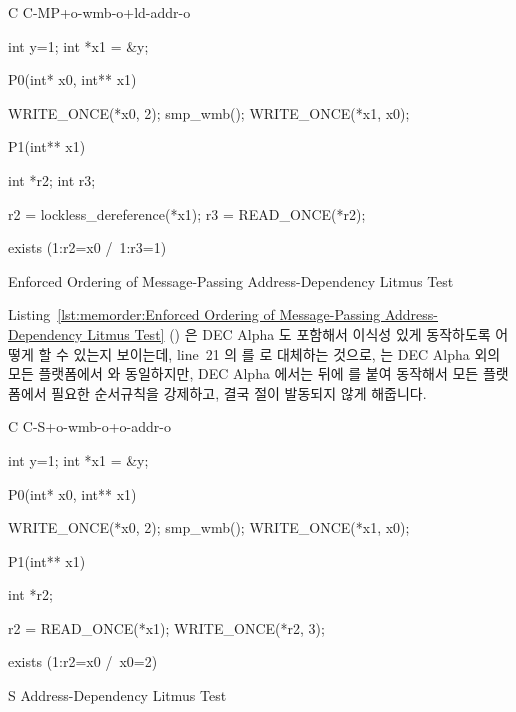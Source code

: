 \begin{listing}[tbp]
{ \scriptsize
\begin{verbbox}[\LstLineNo]
C C-MP+o-wmb-o+ld-addr-o

{
int y=1;
int *x1 = &y;
}

P0(int* x0, int** x1) {

  WRITE_ONCE(*x0, 2);
  smp_wmb();
  WRITE_ONCE(*x1, x0);

}

P1(int** x1) {

  int *r2;
  int r3;

  r2 = lockless_dereference(*x1);
  r3 = READ_ONCE(*r2);

}

exists (1:r2=x0 /\ 1:r3=1)
\end{verbbox}
}
\centering
\theverbbox
\caption{Enforced Ordering of Message-Passing Address-Dependency Litmus Test}
\label{lst:memorder:Enforced Ordering of Message-Passing Address-Dependency Litmus Test}
\end{listing}

Listing~\ref{lst:memorder:Enforced Ordering of Message-Passing Address-Dependency Litmus Test}
()
은 DEC Alpha 도 포함해서 이식성 있게 동작하도록 어떻게 할 수 있는지 보이는데,
line~21 의  를  로 대체하는 것으로,
 는 DEC Alpha 외의 모든 플랫폼에서 
와 동일하지만, DEC Alpha 에서는  뒤에  를 붙여
동작해서 모든 플랫폼에서 필요한 순서규칙을 강제하고, 결국  절이
발동되지 않게 해줍니다.

\begin{listing}[tbp]
{ \scriptsize
\begin{verbbox}[\LstLineNo]
C C-S+o-wmb-o+o-addr-o

{
int y=1;
int *x1 = &y;
}

P0(int* x0, int** x1) {

  WRITE_ONCE(*x0, 2);
  smp_wmb();
  WRITE_ONCE(*x1, x0);

}

P1(int** x1) {

  int *r2;

  r2 = READ_ONCE(*x1);
  WRITE_ONCE(*r2, 3);

}

exists (1:r2=x0 /\ x0=2)
\end{verbbox}
}
\centering
\theverbbox
\caption{S Address-Dependency Litmus Test}
\label{lst:memorder:S Address-Dependency Litmus Test}
\end{listing}

